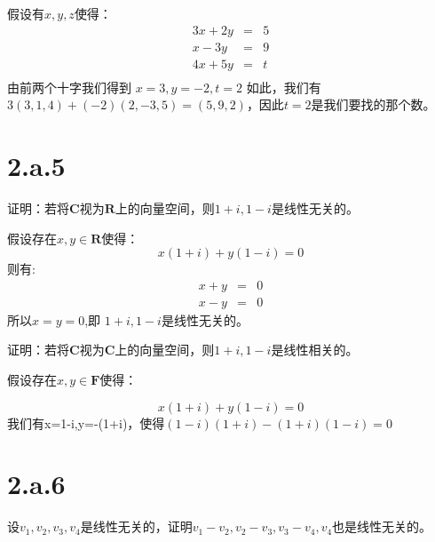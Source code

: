 \documentclass[10pt,a4paper,UTF8]{article}
\begin{document}
\begin{answer}
假设有\(x,y,z\)使得：
\begin{eqnarray}
\label{eq:1}
3x+2y&=&5 \\
x-3y&=&9 \\
4x+5y&=&t \\
\end{eqnarray}
由前两个十字我们得到 \(x=3, y =-2, t= 2\)
如此，我们有 \(3(3,1,4) + (-2)(2,-3,5) = (5,9,2)\)，因此\(t=2\)是我们要找的那个数。
\end{answer}
\section*{2.a.5}
\label{sec:orgef03625}


\begin{problem}
证明：若将\(\mathbf{C}\)视为\(\mathbf{R}\)上的向量空间，则\(1+i,1-i\)是线性无关的。
\end{problem}

\begin{answer}
假设存在\(x,y\in \mathbf{R}\)使得：
\begin{equation}
\label{eq:3}
x(1+i) + y(1-i) = 0
\end{equation}
则有:
\begin{eqnarray*}
x+y&=&0 \\
x-y&=&0
\end{eqnarray*}
所以\(x=y=0\),即 \(1+i,1-i\)是线性无关的。
\end{answer}

\begin{problem}
证明：若将\(\mathbf{C}\)视为\(\mathbf{C}\)上的向量空间，则\(1+i,1-i\)是线性相关的。
\end{problem}

\begin{answer}
假设存在\(x,y\in \mathbf{F}\)使得：

\begin{equation}
\label{eq:4}
x(1+i) + y(1-i) = 0
\end{equation}
我们有x=1-i,y=-(1+i)，使得\((1-i)(1+i) - (1+i)(1-i) = 0\)
\end{answer}
\section*{2.a.6}
\label{sec:org1456dc7}


\begin{problem}
设\(v_{1},v_{2},v_{3},v_{4}\)是线性无关的，证明\(v_{1}-v_{2},v_{2}-v_{3},v_{3}-v_{4},v_{4}\)也是线性无关的。
\end{problem}
\end{document}
